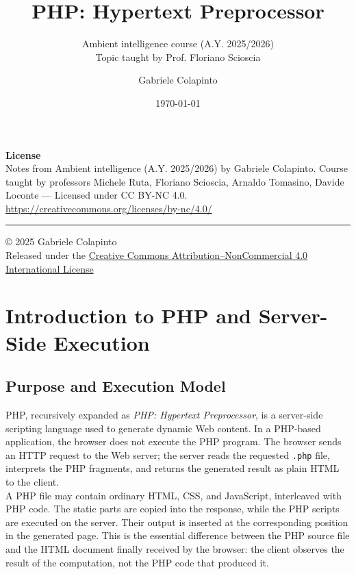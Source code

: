 \documentclass{scrbook}
\title{PHP: Hypertext Preprocessor}
\subtitle{Ambient intelligence course (A.Y. 2025/2026)\\Topic taught by Prof. Floriano Scioscia}
\author{Gabriele Colapinto}
\date{\today}
\begin{document}
	
	\maketitle
	\thispagestyle{empty}
	
	{\Large\textbf{License}} \\
	{Notes from Ambient intelligence (A.Y. 2025/2026) by Gabriele Colapinto. 
		Course taught by professors Michele Ruta, Floriano Scioscia, Arnaldo Tomasino, Davide Loconte — 
		Licensed under CC BY-NC 4.0.\\
		\url{https://creativecommons.org/licenses/by-nc/4.0/}}
	
	\vspace*{\fill}
	\rule{\textwidth}{0.2pt}
	\small{© 2025 Gabriele Colapinto \\
		Released under the \href{https://creativecommons.org/licenses/by-nc/4.0/}{Creative Commons Attribution–NonCommercial 4.0 International License}}
	
	\clearpage
	
	\tableofcontents
	
	\chapter{Introduction to PHP and Server-Side Execution}
	
	\section{Purpose and Execution Model}
	
	PHP, recursively expanded as \emph{PHP: Hypertext Preprocessor}, is a server-side scripting language used to generate dynamic Web content. In a PHP-based application, the browser does not execute the PHP program. The browser sends an HTTP request to the Web server; the server reads the requested \texttt{.php} file, interprets the PHP fragments, and returns the generated result as plain HTML to the client.\\
	
	A PHP file may contain ordinary HTML, CSS, and JavaScript, interleaved with PHP code. The static parts are copied into the response, while the PHP scripts are executed on the server. Their output is inserted at the corresponding position in the generated page. This is the essential difference between the PHP source file and the HTML document finally received by the browser: the client observes the result of the computation, not the PHP code that produced it.\\
	
\end{document}
